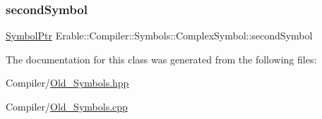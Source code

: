 \subsubsection{\texorpdfstring{secondSymbol}{secondSymbol}}
{\footnotesize\ttfamily \mbox{\hyperlink{namespace_erable_1_1_compiler_1_1_symbols_a8f0bc762f448ea4d84e8713ab3e140b9}{Symbol\+Ptr}} Erable\+::\+Compiler\+::\+Symbols\+::\+Complex\+Symbol\+::second\+Symbol}



The documentation for this class was generated from the following files\+:\begin{DoxyCompactItemize}
\item 
Compiler/\mbox{\hyperlink{_old___symbols_8hpp}{Old\+\_\+\+Symbols.\+hpp}}\item 
Compiler/\mbox{\hyperlink{_old___symbols_8cpp}{Old\+\_\+\+Symbols.\+cpp}}\end{DoxyCompactItemize}
